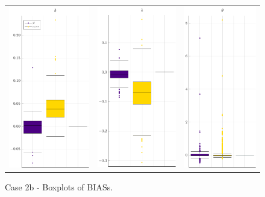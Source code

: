 \begin{figure}[H] 
	
	\centering \begin{tabular}[b]{c c c}
		\includegraphics[width=.3\textwidth]{Figures/2b/BIAS_b.pdf} & \includegraphics[width=.3\textwidth]{Figures/2b/BIAS_a.pdf} & \includegraphics[width=.3\textwidth]{Figures/2b/BIAS_t.pdf}
	\end{tabular}
	\caption{Case 2b - Boxplots of BIASs.}
	\label{fig:bpBIAS2b}
\end{figure}
